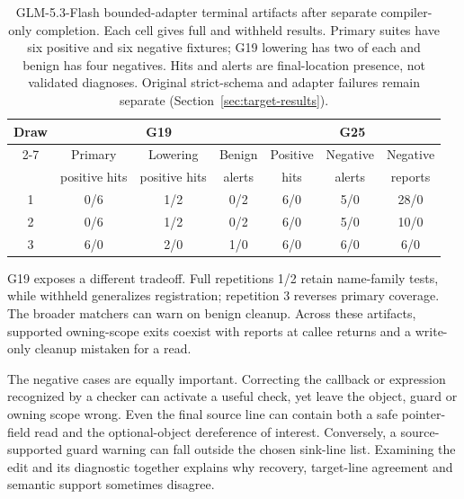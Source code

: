 \begin{table}[!htbp]
\centering
\caption{GLM-5.3-Flash bounded-adapter terminal artifacts after separate compiler-only completion. Each cell gives full and withheld results. Primary suites have six positive and six negative fixtures; G19 lowering has two of each and benign has four negatives. Hits and alerts are final-location presence, not validated diagnoses. Original strict-schema and adapter failures remain separate (Section~\ref{sec:target-results}).}
\label{tab:checkpoint-intervention}
\begingroup\FTTableSetup
\setlength{\extrarowheight}{1bp}
\begin{tabular}{c|ccc|ccc}
\hline\hline
\multirow{3}{*}{Draw}&\multicolumn{3}{c|}{G19}&\multicolumn{3}{c}{G25}\\
\cline{2-7}
&Primary&Lowering&Benign&Positive&Negative&Negative\\
&positive hits&positive hits&alerts&hits&alerts&reports\\\hline
1&0/6&1/2&0/2&6/0&5/0&28/0\\
2&0/6&1/2&0/2&6/0&5/0&10/0\\
3&6/0&2/0&1/0&6/0&6/0&6/0\\
\hline\hline
\end{tabular}\endgroup
\end{table}

G19 exposes a different tradeoff.
Full repetitions 1/2 retain name-family tests, while withheld generalizes registration; repetition 3 reverses primary coverage.
The broader matchers can warn on benign cleanup.
Across these artifacts, supported owning-scope exits coexist with reports at callee returns and a write-only cleanup mistaken for a read.

The negative cases are equally important.
Correcting the callback or expression recognized by a checker can activate a useful check, yet leave the object, guard or owning scope wrong.
Even the final source line can contain both a safe pointer-field read and the optional-object dereference of interest.
Conversely, a source-supported guard warning can fall outside the chosen sink-line list.
Examining the edit and its diagnostic together explains why recovery, target-line agreement and semantic support sometimes disagree.
